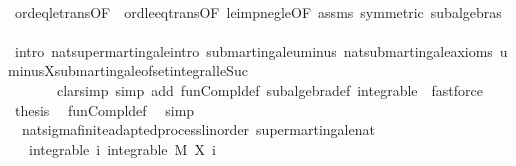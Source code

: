\begin{isabellebody}
\ \ \ \ \isamarkupfalse%
\ ord{\isacharunderscore}{\kern0pt}eq{\isacharunderscore}{\kern0pt}le{\isacharunderscore}{\kern0pt}trans{\isacharbrackleft}{\kern0pt}OF\ {\isacharasterisk}{\kern0pt}\ ord{\isacharunderscore}{\kern0pt}le{\isacharunderscore}{\kern0pt}eq{\isacharunderscore}{\kern0pt}trans{\isacharbrackleft}{\kern0pt}OF\ le{\isacharunderscore}{\kern0pt}imp{\isacharunderscore}{\kern0pt}neg{\isacharunderscore}{\kern0pt}le{\isacharbrackleft}{\kern0pt}OF\ assms{\isacharparenleft}{\kern0pt}{}{\isacharparenright}{\kern0pt}{\isacharbrackright}{\kern0pt}\ {\isacharasterisk}{\kern0pt}{\isacharbrackleft}{\kern0pt}symmetric{\isacharbrackright}{\kern0pt}{\isacharbrackright}{\kern0pt}{\isacharbrackright}{\kern0pt}\ subalgebras\isanewline
\ \ \ \ \isamarkupfalse%
\ {\isacharparenleft}{\kern0pt}intro\ nat{\isacharunderscore}{\kern0pt}supermartingale{\isachardot}{\kern0pt}intro\ submartingale{\isachardot}{\kern0pt}uminus\ nat{\isacharunderscore}{\kern0pt}submartingale{\isachardot}{\kern0pt}axioms\ uminus{\isacharunderscore}{\kern0pt}X{\isachardot}{\kern0pt}submartingale{\isacharunderscore}{\kern0pt}of{\isacharunderscore}{\kern0pt}set{\isacharunderscore}{\kern0pt}integral{\isacharunderscore}{\kern0pt}le{\isacharunderscore}{\kern0pt}Suc{\isacharparenright}{\kern0pt}\ \isanewline
\ \ \ \ \ \ \ {\isacharparenleft}{\kern0pt}clarsimp\ simp\ add{\isacharcolon}{\kern0pt}\ fun{\isacharunderscore}{\kern0pt}Compl{\isacharunderscore}{\kern0pt}def\ subalgebra{\isacharunderscore}{\kern0pt}def\ integrable\ {\isacharbar}{\kern0pt}\ fastforce{\isacharparenright}{\kern0pt}{\isacharplus}{\kern0pt}\isanewline
\ \ \isamarkupfalse%
\ {\isacharquery}{\kern0pt}thesis\ \isamarkupfalse%
\ fun{\isacharunderscore}{\kern0pt}Compl{\isacharunderscore}{\kern0pt}def\ \isamarkupfalse%
\ simp\isanewline
{}\isamarkupfalse%
%
\endisatagproof
{\isafoldproof}%
%
\isadelimproof
\isanewline
%
\endisadelimproof
\isanewline
{}\isamarkupfalse%
\ {\isacharparenleft}{\kern0pt}\ nat{\isacharunderscore}{\kern0pt}sigma{\isacharunderscore}{\kern0pt}finite{\isacharunderscore}{\kern0pt}adapted{\isacharunderscore}{\kern0pt}process{\isacharunderscore}{\kern0pt}linorder{\isacharparenright}{\kern0pt}\ supermartingale{\isacharunderscore}{\kern0pt}nat{\isacharcolon}{\kern0pt}\isanewline
\ \ \ integrable{\isacharcolon}{\kern0pt}\ {\isachardoublequoteopen}{\isasymAnd}i{\isachardot}{\kern0pt}\ integrable\ M\ {\isacharparenleft}{\kern0pt}X\ i{\isacharparenright}{\kern0pt}{\isachardoublequoteclose}\ \isanewline

\end{isabellebody}
